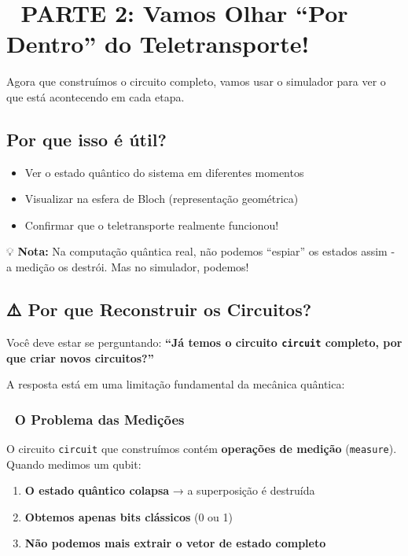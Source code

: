 \documentclass[
  brazilian,
]{report}
\providecommand{\tightlist}{%
  \setlength{\itemsep}{0pt}\setlength{\parskip}{0pt}}
\begin{document}
\chapter{🔬 PARTE 2: Vamos Olhar ``Por Dentro'' do
Teletransporte!}\label{parte-2-vamos-olhar-por-dentro-do-teletransporte}

Agora que construímos o circuito completo, vamos usar o simulador para
ver o que está acontecendo em cada etapa.

\section{Por que isso é útil?}\label{por-que-isso-uxe9-uxfatil}

\begin{itemize}
\tightlist
\item
  Ver o estado quântico do sistema em diferentes momentos
\item
  Visualizar na esfera de Bloch (representação geométrica)
\item
  Confirmar que o teletransporte realmente funcionou!
\end{itemize}

💡 \textbf{Nota:} Na computação quântica real, não podemos ``espiar'' os
estados assim - a medição os destrói. Mas no simulador, podemos!

\section{⚠️ Por que Reconstruir os
Circuitos?}\label{por-que-reconstruir-os-circuitos}

Você deve estar se perguntando: \textbf{``Já temos o circuito
\texttt{circuit} completo, por que criar novos circuitos?''}

A resposta está em uma limitação fundamental da mecânica quântica:

\subsection{🚫 O Problema das
Medições}\label{o-problema-das-mediuxe7uxf5es}

O circuito \texttt{circuit} que construímos contém \textbf{operações de
medição} (\texttt{measure}). Quando medimos um qubit:

\begin{enumerate}
\def\labelenumi{\arabic{enumi}.}
\tightlist
\item
  \textbf{O estado quântico colapsa} → a superposição é destruída
\item
  \textbf{Obtemos apenas bits clássicos} (0 ou 1)
\item
  \textbf{Não podemos mais extrair o vetor de estado completo}
\end{enumerate}
\end{document}
